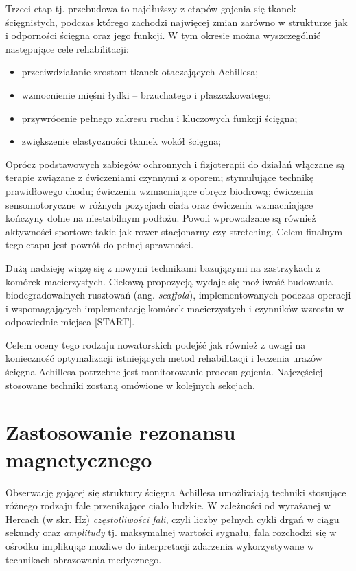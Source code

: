Trzeci etap tj. przebudowa to najdłuższy z etapów gojenia się tkanek ścięgnistych, podczas którego zachodzi najwięcej zmian zarówno w strukturze jak i odporności ścięgna oraz jego funkcji. W tym okresie można wyszczególnić następujące cele rehabilitacji: 
\begin{itemize}
	\item przeciwdziałanie zrostom tkanek otaczających Achillesa; 
	\item wzmocnienie mięśni łydki – brzuchatego i płaszczkowatego; 
	\item przywrócenie pełnego zakresu ruchu i kluczowych funkcji ścięgna; 
	\item zwiększenie elastyczności tkanek wokół ścięgna;
\end{itemize}

Oprócz podstawowych zabiegów ochronnych i fizjoterapii do działań włączane są terapie związane z ćwiczeniami czynnymi z oporem; stymulujące technikę prawidłowego chodu; ćwiczenia wzmacniające obręcz biodrową; ćwiczenia sensomotoryczne w różnych pozycjach ciała oraz ćwiczenia wzmacniające kończyny dolne na niestabilnym podłożu. Powoli wprowadzane są również aktywności sportowe takie jak rower stacjonarny czy stretching. Celem finalnym tego etapu jest powrót do pełnej sprawności. 

Dużą nadzieję wiążę się z nowymi technikami bazującymi na zastrzykach z komórek macierzystych. Ciekawą propozycją wydaje się możliwość budowania biodegradowalnych rusztowań (ang. \textit{scaffold}), implementowanych podczas operacji i wspomagających implementację komórek macierzystych i czynników wzrostu w odpowiednie miejsca [START].

Celem oceny tego rodzaju nowatorskich podejść jak również z uwagi na konieczność optymalizacji istniejących metod rehabilitacji i leczenia urazów ścięgna Achillesa potrzebne jest monitorowanie procesu gojenia. Najczęściej stosowane techniki zostaną omówione w kolejnych sekcjach.

\section{Zastosowanie rezonansu magnetycznego}
 
Obserwację gojącej się struktury ścięgna Achillesa umożliwiają techniki stosujące różnego rodzaju fale przenikające ciało ludzkie. W zależności od wyrażanej w Hercach (w skr. Hz) \textit{częstotliwości fali}, czyli liczby pełnych cykli drgań w ciągu sekundy oraz \textit{amplitudy} tj. maksymalnej wartości sygnału, fala rozchodzi się w ośrodku implikując możliwe do interpretacji zdarzenia wykorzystywane w technikach obrazowania medycznego. 

